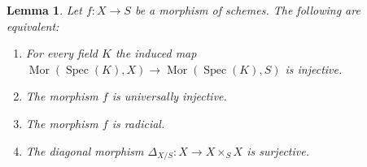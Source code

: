 \documentclass[10pt,a4paper]{amsart}
\theoremstyle{plain}
\newtheorem{lemma}[subsection]{Lemma}
\theoremstyle{definition}
\theoremstyle{remark}
\numberwithin{equation}{subsection}
\def\Spec{\mathop{\mathrm{Spec}}}
\def\Mor{\mathop{\mathrm{Mor}}\nolimits}
\newenvironment{reference}{\comment}{\endcomment}
\begin{document}
\begin{lemma}
\label{lemma-universally-injective}
\begin{reference}
\cite[Proposition 3.7.1]{EGA1-second}
\end{reference}
Let $f : X \to S$ be a morphism of schemes.
The following are equivalent:
\begin{enumerate}
\item For every field $K$ the induced map
$\Mor(\Spec(K), X) \to \Mor(\Spec(K), S)$
is injective.
\item The morphism $f$ is universally injective.
\item The morphism $f$ is radicial.
\item The diagonal morphism $\Delta_{X/S} : X \longrightarrow X \times_S X$
is surjective.
\end{enumerate}
\end{lemma}
\end{document}
